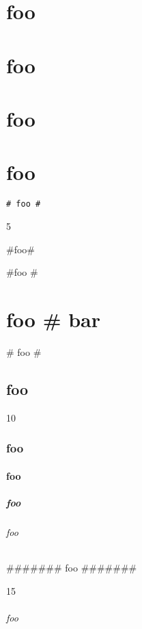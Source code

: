 
\def\mytitle{Headers}


\part{foo}
\label{foo}

\part{foo}
\label{foo}

\part{foo}
\label{foo}

\part{foo}
\label{foo}

\begin{verbatim}
# foo #
\end{verbatim}

5

\#foo\#

\#foo \#

\part{foo \# bar}
\label{foobar}

\# foo \#

\chapter{foo}
\label{foo}

10

\section{foo}
\label{foo}

\subsection{foo}
\label{foo}

\subsubsection{foo}
\label{foo}

\paragraph{foo}
\label{foo}

\#\#\#\#\#\#\# foo \#\#\#\#\#\#\#

15

\paragraph{foo}
\label{foo}



